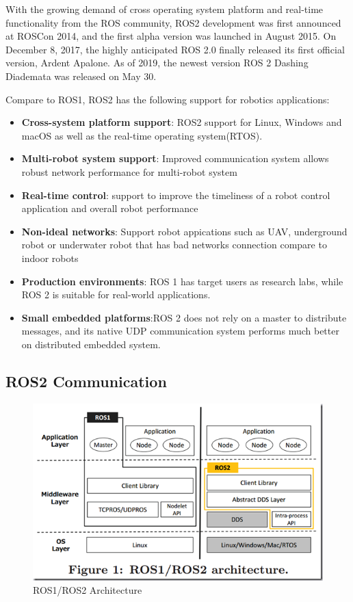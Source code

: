 \documentclass[letterpaper, 10 pt, conference]{ieeeconf}  %
\begin{document}
With the growing demand of cross operating system platform and real-time functionality from the ROS community, ROS2 development was first announced at ROSCon 2014, and the first alpha version was launched in August 2015. On December 8, 2017, the highly anticipated ROS 2.0 finally released its first official version, Ardent Apalone. As of 2019, the newest version ROS 2 Dashing Diademata was released on May 30.

Compare to ROS1, ROS2 has the following support for robotics applications\cite{c3}: 
\begin{itemize}
  \item \textbf{Cross-system platform support}: ROS2 support for Linux, Windows and macOS as well as the real-time operating system(RTOS).
  \item \textbf{Multi-robot system support}: Improved communication system allows robust network performance for multi-robot system 
  \item \textbf{Real-time control}: support to improve the timeliness of a robot control application and overall robot performance
  \item \textbf{Non-ideal networks}: Support robot appications such as UAV, underground robot or underwater robot that has bad networks connection compare to indoor robots 
  \item \textbf{Production environments}: ROS 1 has target users as research labs, while ROS 2 is suitable for real-world applications. 
  \item \textbf{Small embedded platforms}:ROS 2 does not rely on a master to distribute messages, and its native UDP communication system performs much better on distributed embedded system\cite{c6}. 
\end{itemize}

\subsection{ROS2 Communication}
\begin{figure}[ht]
  \includegraphics[width=\linewidth]{ros1_ros2_architecture.png}
  \caption{ROS1/ROS2 Architecture \cite{c1}} 
  \label{fig:ros2_architecture}
\end{figure}
\end{document}
